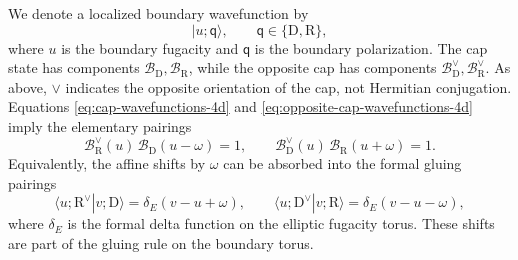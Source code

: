 \documentclass[11pt,a4paper]{article}
\numberwithin{equation}{section}
\theoremstyle{plain}
\theoremstyle{definition}
\theoremstyle{remark}
\begin{document}
We denote a localized boundary wavefunction by
\begin{equation}
|u;\mathsf q\rangle,
\qquad
\mathsf q\in\{\mathrm D,\mathrm R\},
\end{equation}
where \(u\) is the boundary fugacity and \(\mathsf q\) is the boundary polarization.  The cap state has components \(\mathcal B_{\mathrm D},\mathcal B_{\mathrm R}\), while the opposite cap has components \(\mathcal B_{\mathrm D}^{\vee},\mathcal B_{\mathrm R}^{\vee}\).  As above, \(\vee\) indicates the opposite orientation of the cap, not Hermitian conjugation.  Equations \eqref{eq:cap-wavefunctions-4d} and \eqref{eq:opposite-cap-wavefunctions-4d} imply the elementary pairings
\begin{equation}
\mathcal B_{\mathrm R}^{\vee}(u)\,\mathcal B_{\mathrm D}(u-\omega)=1,
\qquad
\mathcal B_{\mathrm D}^{\vee}(u)\,\mathcal B_{\mathrm R}(u+\omega)=1.
\label{eq:cap-dual-pairings}
\end{equation}
Equivalently, the affine shifts by \(\omega\) can be absorbed into the formal gluing pairings
\begin{equation}
\langle u;\mathrm R^{\vee}|v;\mathrm D\rangle
=
\delta_E(v-u+\omega),
\qquad
\langle u;\mathrm D^{\vee}|v;\mathrm R\rangle
=
\delta_E(v-u-\omega),
\label{eq:formal-boundary-pairing}
\end{equation}
where \(\delta_E\) is the formal delta function on the elliptic fugacity torus.  These shifts are part of the gluing rule on the boundary torus.
\end{document}
